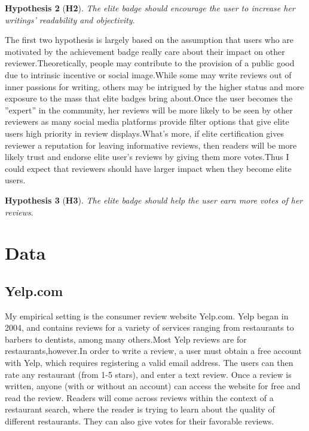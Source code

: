 \documentclass[12pt]{article}%
\begin{document}
\textbf{Hypothesis 2} (\textbf{H2}). \emph{The elite badge should encourage the user to increase her writings' readability and objectivity}.


The first two hypothesis is largely based on the assumption that users who are motivated by the achievement badge really care about their impact on other reviewer.Theoretically, people may contribute to the provision of a public good due to intrinsic incentive or social image\citep{benabou2006incentives}.While some may write reviews out of inner passions for writing, others may be intrigued by the higher status and more exposure to the mass that elite badges bring about.Once the user becomes the ''expert'' in the community, her reviews will be more likely to be seen by other reviewers as many social media platforms provide filter options that give elite users high priority in review displays.What's more, if elite certification gives reviewer a reputation for leaving informative reviews, then readers will be more likely trust and endorse elite user's reviews by giving them more votes.Thus I could expect that reviewers should have larger impact when they become elite users.


\textbf{Hypothesis 3} (\textbf{H3}). \emph{The elite badge should help the user earn more votes of her reviews}.

\section{Data}
\label{Related}

\subsection{Yelp.com}
My empirical setting is the consumer review website Yelp.com. Yelp began in 2004, and contains reviews for a variety of services ranging from restaurants to barbers to dentists, among many others.Most Yelp reviews are for restaurants,however.In order to write a review, a user must obtain a free account with Yelp, which requires registering a valid email address. The users can then rate any restaurant (from 1-5 stars), and enter a text review. Once a review is written, anyone (with or without an account) can access the website for free and read the review. Readers will come across reviews within the context of a restaurant search, where the reader is trying to learn about the quality of different restaurants. They can also give votes for their favorable reviews.
\end{document}
